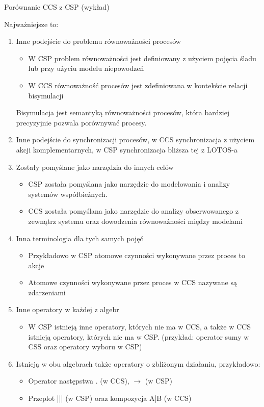 \documentclass[a4paper,15pt]{article}
\newcommand{\issue}[2]{
    \begin{tcolorbox}[colback=issueColor!5!white,colframe=issueColor,title={Zagadnienie #1}]
        #2
    \end{tcolorbox}
}
\begin{document}
\issue{2}{
Porównanie CCS z CSP (wykład)
}
Najważniejsze to: 
\begin{enumerate}

\item Inne podejście do problemu równoważności procesów
\begin{itemize}
\item W CSP problem równoważności jest definiowany z użyciem pojęcia śladu lub przy użyciu modelu niepowodzeń
\item W CCS równoważność procesów jest zdefiniowana w kontekście relacji bisymulacji
\end{itemize}
Bisymulacja jest semantyką równoważności procesów, która bardziej precyzyjnie pozwala porównywać procesy.  

\item Inne podejście do synchronizacji procesów, w CCS synchronizacja z użyciem akcji komplementarnych, w CSP synchronizacja bliższa tej z LOTOS-a

\item Zostały pomyślane jako narzędzia do innych celów
\begin{itemize}
\item CSP została pomyślana jako narzędzie do modelowania i analizy systemów współbieżnych.
\item CCS została pomyślana jako narzędzie do analizy obserwowanego z zewnątrz systemu oraz dowodzenia równoważności między modelami 
\end{itemize}

\item Inna terminologia dla tych samych pojęć
\begin{itemize}
\item Przykładowo w CSP atomowe czynności wykonywane przez proces to akcje
\item Atomowe czynności wykonywane przez proces w CCS nazywane są zdarzeniami
\end{itemize}

\item Inne operatory w każdej z algebr
\begin{itemize}
\item W CSP istnieją inne operatory, których nie ma w CCS, a także w CCS istnieją operatory, których nie ma w CSP. (przykład: operator sumy w CSS oraz operatory wyboru w CSP)
\end{itemize}

\item Istnieją w obu algebrach także operatory o zbliżonym działaniu, przykładowo:
\begin{itemize}
\item Operator następstwa . (w CCS), $\rightarrow$ (w CSP)
\item Przeplot ||| (w CSP) oraz kompozycja A|B (w CCS)
\end{itemize}

\end{enumerate}
\end{document}
